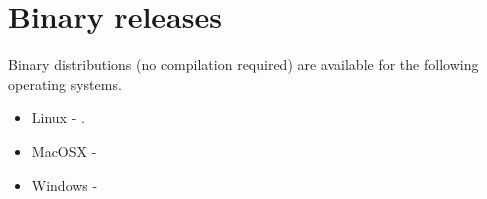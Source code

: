 
%
%
%


\chapter{Binary releases}\label{chap:bin}

Binary distributions (no compilation required) are available for the following operating systems.
\begin{itemize}
 \item Linux - .
\item MacOSX - 
\item Windows - 
\end{itemize}


